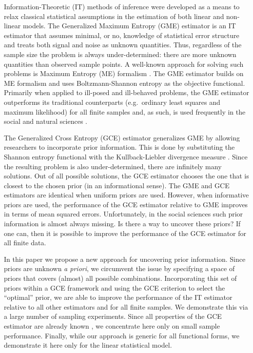 \documentclass{elsarticle}
\begin{document}
Information-Theoretic (IT) methods of inference were developed as a means to relax 
classical statistical assumptions in the estimation of both linear and non-linear models.
The Generalized Maximum Entropy (GME) estimator is an IT estimator that assumes 
minimal, or no, knowledge of statistical error structure and treats both signal and noise 
as unknown quantities. 
Thus, regardless of the sample size the problem is always under-determined: there are 
more unknown quantities than observed sample points. 
A well-known approach for solving such problems is Maximum Entropy (ME) formalism 
\citep{jaynes1957a, jaynes1957b}. 
The GME estimator builds on ME formalism and uses Boltzmann-Shannon entropy 
\citep{shannon1948} as the objective functional.
Primarily when applied to ill-posed and ill-behaved problems, the GME estimator 
outperforms its traditional counterparts (e.g.\ ordinary least squares and maximum likelihood) 
for all finite samples and, as such, is used frequently in the social and natural sciences
\citep{golan1996}. 

The Generalized Cross Entropy (GCE) estimator generalizes GME by allowing 
researchers to incorporate prior information. 
This is done by substituting the Shannon entropy functional with the Kullback-Liebler 
divergence measure \citep{kullback1951}.  
Since the resulting problem is also under-determined, there are infinitely many solutions. 
Out of all possible solutions, the GCE estimator chooses the one that is closest to the 
chosen prior (in an informational sense).
The GME and GCE estimators are identical when uniform priors are used. 
However, when informative priors are used, the performance of the GCE estimator relative 
to GME improves in terms of mean squared errors. 
Unfortunately, in the social sciences such prior information is almost always missing. 
Is there a way to uncover these priors? 
If one can, then it is possible to improve the performance of the GCE estimator for all 
finite data. 

In this paper we propose a new approach for uncovering prior information. 
Since priors are unknown \emph{a priori}, we circumvent the issue by specifying a 
space of priors that covers (almost) all possible combinations. 
Incorporating this set of priors within a GCE framework and using the GCE criterion to 
select the ``optimal'' prior, we are able to improve the performance of the IT estimator 
relative to all other estimators and for all finite samples.
We demonstrate this via a large number of sampling experiments. 
Since all properties of the GCE estimator are already known \citep{golan1996, 
mittelhammer2000}, we concentrate here only on small sample performance. 
Finally, while our approach is generic for all functional forms, we demonstrate it here 
only for the linear statistical model.
\end{document}
